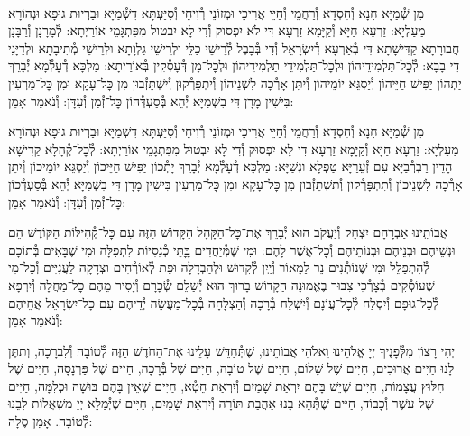 \documentclass[twoside, openany, parskip=half, 11pt]{book}
\begin{document}

\shabbos\\
מִן שְׁ֯מַיָּא חִנָּא וְ֯חִסְדָּא וְ֯רַחֲמֵי וְ֯חַיֵּי אֲרִיכֵי וּמְזוֹנֵי רְ֯וִיחֵי וְ֯סִיַּעְתָּא דִשְּׁ֯מַיָּא וּבַרְיוּת גּוּפָא וּנְהוֹרָא מַעַלְיָא: זַרְעָא חַיָּא וְ֯קַיָּמָא זַרְעָא דִּי לֹא יִפְסוּק וְ֯דִי לָא יִבְטוּל מִפִּתְגָּמֵי אוֹרַיְתָא: לְ֯מָרָנָן וְ֯רַבָּנָן חֲבוּרָתָא קַדִּישָׁתָא דִּי בְ֯אַרְעָא דְ֯יִשְׂרָאֵל וְ֯דִי בְּ֯בָבֶל לְ֯רֵישֵׁי כַלֵּי וּלְרֵישֵׁי גַלְוָתָא וּלְרֵישֵׁי מְ֯תִיבָתָא וּלְדַיָּנֵי דִי בָבָא: לְ֯כׇל־תַּלְמִידֵיהוֹן וּלְכׇל־תַּלְמִידֵי תַלְמִידֵיהוֹן וּלְכׇל־מָן דְּ֯עָסְ֯קִין בְּ֯אוֹרַיְתָא: מַלְכָּא דְ֯עָלְ֯מָא יְ֯בָרֵךְ יַתְהוֹן יַפִּישׁ חַיֵּיהוֹן וְ֯יַסְגֵּא יוֹמֵיהוֹן וְ֯יִתֵּן אָרְ֯כָה לִשְׁנֵיהוֹן וְ֯יִתְפָּרְ֯קוּן וְ֯יִשְׁתֵּזְ֯בוּן מִן כׇּל־עָקָא וּמִן כׇּל־מַרְעִין בִּישִׁין מָרָן דִּי בִשְׁמַיָּא יְ֯הֵא בְּ֯סַעְדְּ֯הוֹן כׇּל־זְ֯מַן וְ֯עִדָּן: וְ֯נֹאמַר אָמֵן:



מִן שְׁ֯מַיָּא חִנָּא וְ֯חִסְדָּא וְ֯רַחֲמֵי וְ֯חַיֵּי אֲרִיכֵי וּמְזוֹנֵי רְ֯וִיחֵי וְ֯סִיַּעְתָּא דִּשְׁמַיָּא וּבַרְיוּת גּוּפָא וּנְהוֹרָא מַעַלְיָא: זַרְעָא חַיָּא וְ֯קַיָּמָא זַרְעָא דִּי לָא יִפְסוּק וְ֯דִי לָא יִבְטוּל מִפִּתְגָּמֵי אוֹרַיְתָא: לְ֯כׇל־קְ֯הָלָא קַדִּישָׁא הָדֵין רַבְרְ֯בַיָּא עִם זְ֯עֵרַיָּא טַפְלָא וּנְשַׁיָּא: מַלְכָּא דְ֯עָלְ֯מָא יְ֯בָרֵךְ יָתְ֯כוֹן יַפִּישׁ חַיֵּיכוֹן וְ֯יַסְגֵּא יוֹמֵיכוֹן וְ֯יִתֵּן אָרְ֯כָה לִשְׁנֵיכוֹן וְ֯תִתְפָּרְ֯קוּן וְ֯תִשְׁתֵּזְ֯בוּן מִן כׇּל־עָקָא וּמִן כׇּל־מַרְעִין בִּישִׁין מָרָן דִּי בִשְׁמַיָּא יְ֯הֵא בְּ֯סַעְדְּ֯כוֹן כׇּל־זְ֯מַן וְ֯עִדָּן: וְ֯נֹאמַר אָמֵן:

אֲבוֹתֵֽינוּ אַבְרָהָם יִצְחָק וְ֯יַעֲקֹב הוּא יְ֯בָרֵךְ אֶת־כׇּל־הַקָּהָל הַקָּדוֹשׁ הַזֶּה עִם כׇּל־קְ֯הִילּוֹת הַקּוֹדֶשׁ הֵם וּנְשֵׁיהֶם וּבְנֵיהֶם וּבְנוֹתֵיהֶם וְ֯כׇל־אֲשֶׁר לָהֶם: וּמִי שֶׁמְּ֯יַחֲדִים בׇׇּתֵּי כְ֯נֵסִיּוֹת לִתְפִלָּה וּמִי שֶׁבָּאִים בְּ֯תוֹכָם לְ֯הִתְפַּלֵּל וּמִי שֶׁנּוֹתְ֯נִים נֵר לַמָּאוֹר וְ֯יַֽיִן לְ֯קִדּוּשׁ וּלְהַבְדָּלָה וּפַת לְ֯אוֹרְ֯חִים וּצְדָקָה לַעֲנִיִּים וְ֯כׇל־מִי שֶׁעוֹסְ֯קִים בְּ֯צָרְ֯כֵי צִבּוּר בֶּאֱמוּנָה הַקָּדוֹשׁ בָּרוּךְ הוּא יְ֯שַׁלֵם שְׂ֯כָרָם וְ֯יָסִיר מֵהֶם כׇּל־מַחֲלָה וְ֯יִרְפָּא לְ֯כׇל־גּוּפָם וְ֯יִסְלַח לְ֯כׇל־עֲוֹנָם וְ֯יִשְׁלַח בְּ֯רָכָה וְ֯הַצְלָחָה בְּ֯כׇל־מַעֲשֵׂה יְ֯דֵיהֶם עִם כָּל־יִשְׂרָאֵל אֲחֵיהֶם וְ֯נֹאמַר אָמֵן:







יְהִי רָצוֹן מִלְּ֯פָנֶיךָ יְיָ אֱלֹהֵינוּ וֵאלֹהֵי אֲבוֹתֵינוּ,
שֶׁתְּ֯חַדֵּשׁ עָלֵינוּ אֶת־הַחֹדֶשׁ הַזֶּה לְ֯טוֹבָה וְ֯לִבְרָכָה,
וְתִתֶּן לָנוּ חַיִּים אֲרוּכִים,
חַיִּים שֶׁל שָׁלוֹם,
חַיִּים שֶׁל טוֹבָה,
חַיִּים שֶׁל בְּ֯רָכָה,
חַיִּים שֶׁל פַּרְנָסָה,
חַיִּים שֶׁל חִלּוּץ עֲצָמוֹת,
חַיִּים שֶׁיֵשׁ בָּהֶם יִרְאַת שָׁמַיִם וְ֯יִרְאַת חֵטְ֯א,
חַיִּים שֶׁאֵין בָּהֶם בּוּשָׁה וּכְלִמָּה,
חַיִּים שֶׁל עשֶׁר וְ֯כָבוֹד,
חַיִּים שֶׁתְּ֯הֵא בָנוּ אַהֲבַת תּוֹרָה וְ֯יִרְאַת שָׁמַיִם,
חַיִּים שֶׁיְּ֯מַּלֵא יְיָ מִשְׁאֲלוֹת לִבֵּנוּ לְ֯טוֹבָה. אָמֵן סֶלָה:
\end{document}

